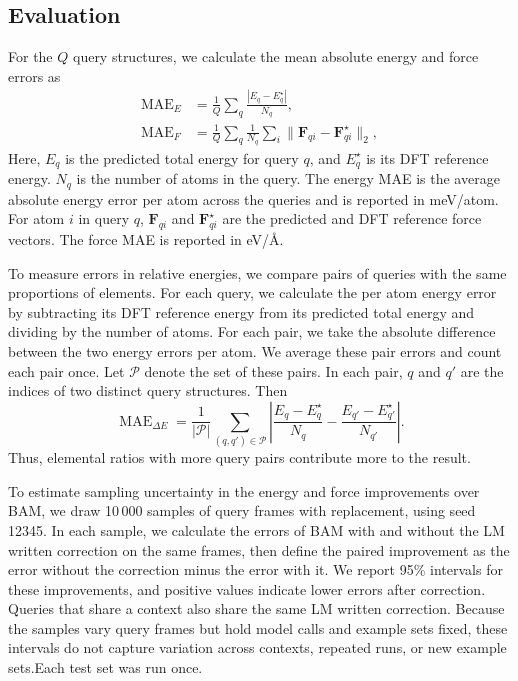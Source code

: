 \ifbulk
\subsection{Evaluation}

For the $Q$ query structures, we calculate the mean absolute energy and force errors as
\begin{align}
\operatorname{MAE}_E&=\frac1Q\sum_q\frac{|E_q-E_q^\star|}{N_q},\\
\operatorname{MAE}_{F}&=\frac1Q\sum_q\frac1{N_q}\sum_i\|\mathbf F_{qi}-\mathbf F_{qi}^\star\|_2 ,
\end{align}
Here, $E_q$ is the predicted total energy for query $q$, and $E_q^\star$ is its DFT reference energy. $N_q$ is the number of atoms in the query. The energy MAE is the average absolute energy error per atom across the queries and is reported in meV/atom. For atom $i$ in query $q$, $\mathbf F_{qi}$ and $\mathbf F_{qi}^\star$ are the predicted and DFT reference force vectors. The force MAE is reported in eV/\AA.
\fi

\ifbulk
To measure errors in relative energies, we compare pairs of queries with the same proportions of elements. For each query, we calculate the per atom energy error by subtracting its DFT reference energy from its predicted total energy and dividing by the number of atoms. For each pair, we take the absolute difference between the two energy errors per atom. We average these pair errors and count each pair once. Let $\mathcal{P}$ denote the set of these pairs. In each pair, $q$ and $q'$ are the indices of two distinct query structures. Then
\begin{equation}
\operatorname{MAE}_{\Delta E}=\frac{1}{|\mathcal{P}|}\sum_{(q,q')\in\mathcal{P}}\left|\frac{E_q-E_q^\star}{N_q}-\frac{E_{q'}-E_{q'}^\star}{N_{q'}}\right|.
\end{equation}
Thus, elemental ratios with more query pairs contribute more to the result. 

To estimate sampling uncertainty in the energy and force improvements over BAM, we draw 10\,000 samples of query frames with replacement, using seed 12345. In each sample, we calculate the errors of BAM with and without the LM written correction on the same frames, then define the paired improvement as the error without the correction minus the error with it. We report 95\% intervals for these improvements, and positive values indicate lower errors after correction. Queries that share a context also share the same LM written correction. Because the samples vary query frames but hold model calls and example sets fixed, these intervals do not capture variation across contexts, repeated runs, or new example sets.\ifbulk Each test set was run once.\fi
\fi

